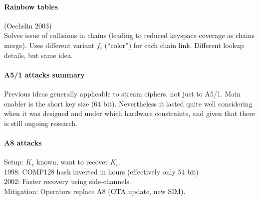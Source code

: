 

\paragraph{Rainbow tables} (Oechslin 2003)
\\
Solves issue of collisions in chains (leading to reduced keyspace coverage as chains merge).
Uses different variant $f_i$ (``color'') for each chain link.
Different lookup details, but same idea.

\paragraph{A5/1 attacks summary}
Previous ideas generally applicable to stream ciphers, not just to A5/1. Main
enabler is the short key size (64 bit). Nevertheless it lasted quite well
considering when it was designed and under which hardware constraints, and
given that there is still ongoing research.

\paragraph{A8 attacks}
Setup: $K_c$ known, want to recover $K_i$. \\ 1998: COMP128 hash inverted in
hours (effectively only 54 bit)\\ 2002: Faster recovery using side-channels. \\
Mitigation: Operators replace A8 (OTA update, new SIM).

